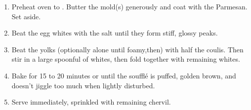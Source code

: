 \begin{recipe}
  \begin{enumerate}

  \item Preheat oven to .  Butter the mold(s) generously
    and coat with the Parmesan.  Set aside.

  \item Beat the egg whites with the salt until they form stiff,
    glossy peaks.

  \item Beat the yolks (optionally alone until foamy,then) with half
    the coulis.  Then stir in a large spoonful of whites, then fold
    together with remaining whites.

  \item Bake for 15 to 20 minutes or until the souffl\'e is puffed,
    golden brown, and doesn't jiggle too much when lightly disturbed.

  \item Serve immediately, sprinkled with remaining chervil.

  \end{enumerate}
\end{recipe}

